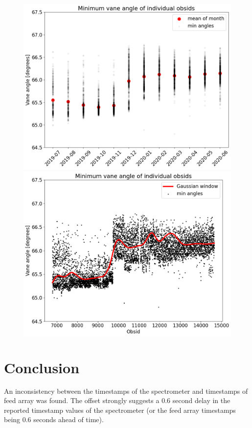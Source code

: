 \documentclass[10pt, a4paper]{article}
\begin{document}
\begin{figure}[H]
    \centering
    \includegraphics[scale=0.36]{../plots/angle_minima.png}
    \includegraphics[scale=0.36]{../plots/angle_minima_datetime.png}
    \caption{}
    \label{fig:angle_drift}
\end{figure}


\section{Conclusion}
An inconsistency between the timestamps of the spectrometer and timestamps of feed array was found. The offset strongly suggests a 0.6 second delay in the reported timestamp values of the spectrometer (or the feed array timestamps being 0.6 seconds ahead of time).
\end{document}
